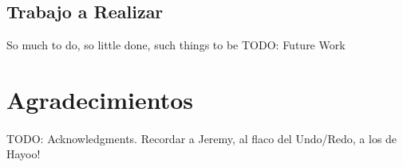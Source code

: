 \documentclass[a4paper]{article}
\begin{document}
\subsection{Trabajo a Realizar}
\begin{epigraphs}
\end{epigraphs}
So much to do, so little done, such things to be
TODO: Future Work

\section{Agradecimientos}
\paragraph{}TODO: Acknowledgments.  Recordar a Jeremy, al flaco del Undo/Redo, a los de Hayoo!
\end{document}
